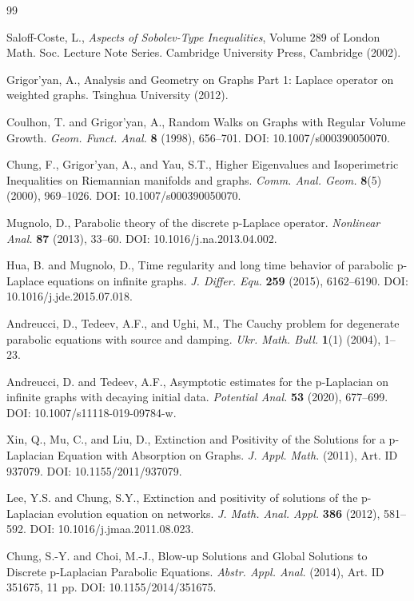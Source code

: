 \documentclass{article}
\begin{document}
	
	\begin{thebibliography}{99}
		
		
		 Saloff-Coste, L., \textit{Aspects of Sobolev-Type Inequalities}, Volume 289 of London Math. Soc. Lecture Note Series. Cambridge University Press, Cambridge (2002).
		
		 Grigor'yan, A., Analysis and Geometry on Graphs Part 1: Laplace operator on weighted graphs. Tsinghua University (2012).
		
		 Coulhon, T. and Grigor'yan, A., Random Walks on Graphs with Regular Volume Growth. \textit{Geom. Funct. Anal.} \textbf{8} (1998), 656--701. DOI: 10.1007/s000390050070.
		
		 Chung, F., Grigor'yan, A., and Yau, S.T., Higher Eigenvalues and Isoperimetric Inequalities on Riemannian manifolds and graphs. \textit{Comm. Anal. Geom.} \textbf{8}(5) (2000), 969--1026. DOI: 10.1007/s000390050070.
		
		 Mugnolo, D., Parabolic theory of the discrete p-Laplace operator. \textit{Nonlinear Anal.} \textbf{87} (2013), 33--60. DOI: 10.1016/j.na.2013.04.002.
		
		 Hua, B. and Mugnolo, D., Time regularity and long time behavior of parabolic p-Laplace equations on infinite graphs. \textit{J. Differ. Equ.} \textbf{259} (2015), 6162--6190. DOI: 10.1016/j.jde.2015.07.018.
		
		
		 Andreucci, D., Tedeev, A.F., and Ughi, M., The Cauchy problem for degenerate parabolic equations with source and damping. \textit{Ukr. Math. Bull.} \textbf{1}(1) (2004), 1--23.
		
		
		 Andreucci, D. and Tedeev, A.F., Asymptotic estimates for the p-Laplacian on infinite graphs with decaying initial data. \textit{Potential Anal.} \textbf{53} (2020), 677--699. DOI: 10.1007/s11118-019-09784-w.
		
		 Xin, Q., Mu, C., and Liu, D., Extinction and Positivity of the Solutions for a p-Laplacian Equation with Absorption on Graphs. \textit{J. Appl. Math.} (2011), Art. ID 937079. DOI: 10.1155/2011/937079.
		
		 Lee, Y.S. and Chung, S.Y., Extinction and positivity of solutions of the p-Laplacian evolution equation on networks. \textit{J. Math. Anal. Appl.} \textbf{386} (2012), 581--592. DOI: 10.1016/j.jmaa.2011.08.023.
		
		 Chung, S.-Y. and Choi, M.-J., Blow-up Solutions and Global Solutions to Discrete p-Laplacian Parabolic Equations. \textit{Abstr. Appl. Anal.} (2014), Art. ID 351675, 11 pp. DOI: 10.1155/2014/351675.
		

\end{thebibliography}
\end{document}
